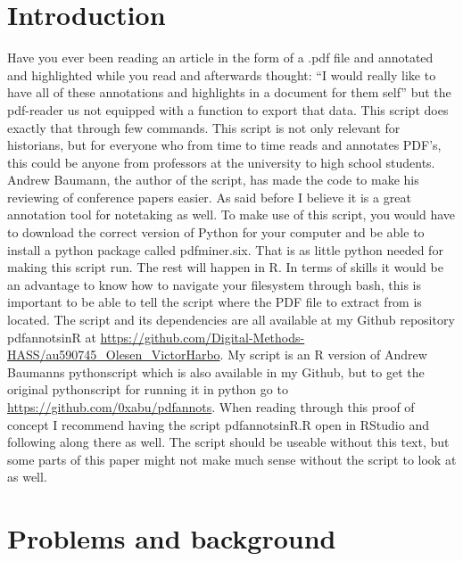 \documentclass{article}
\begin{document}
\section{Introduction}
Have you ever been reading an article in the form of a .pdf file and annotated and highlighted while you read and afterwards thought: “I would really like to have all of these annotations and highlights in a document for them self” but the pdf-reader us not equipped with a function to export that data. This script does exactly that through few commands. This script is not only relevant for historians, but for everyone who from time to time reads and annotates PDF’s, this could be anyone from professors at the university to high school students. Andrew Baumann, the author of the script, has made the code to make his reviewing of conference papers easier. As said before I believe it is a great annotation tool for notetaking as well. \newline
To make use of this script, you would have to download the correct version of Python for your computer and be able to install a python package called pdfminer.six. That is as little python needed for making this script run. The rest will happen in R. In terms of skills it would be an advantage to know how to navigate your filesystem through bash, this is important to be able to tell the script where the PDF file to extract from is located.\newline
The script and its dependencies are all available at my Github repository pdfannots\textunderscore in\textunderscore R at \url{https://github.com/Digital-Methods-HASS/au590745_Olesen_VictorHarbo}. My script is an R version of Andrew Baumanns pythonscript which is also available in my Github, but to get the original pythonscript for running it in python go to \url{https://github.com/0xabu/pdfannots}. When reading through this proof of concept I recommend having the script pdfannots\textunderscore inR.R open in RStudio and following along there as well. The script should be useable without this text, but some parts of this paper might not make much sense without the script to look at as well. 

\section{Problems and background}
\end{document}
